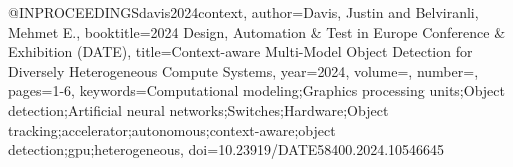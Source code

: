@INPROCEEDINGS{davis2024context,
  author={Davis, Justin and Belviranli, Mehmet E.},
  booktitle={2024 Design, Automation & Test in Europe Conference & Exhibition (DATE)}, 
  title={Context-aware Multi-Model Object Detection for Diversely Heterogeneous Compute Systems}, 
  year={2024},
  volume={},
  number={},
  pages={1-6},
  keywords={Computational modeling;Graphics processing units;Object detection;Artificial neural networks;Switches;Hardware;Object tracking;accelerator;autonomous;context-aware;object detection;gpu;heterogeneous},
  doi={10.23919/DATE58400.2024.10546645}}
